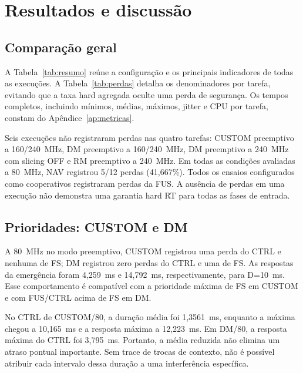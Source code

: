 \section{Resultados e discussão}
\label{sec:resultados}

\subsection{Comparação geral}

A Tabela~\ref{tab:resumo} reúne a configuração e os principais indicadores de todas as execuções. A Tabela~\ref{tab:perdas} detalha os denominadores por tarefa, evitando que a taxa hard agregada oculte uma perda de segurança. Os tempos completos, incluindo mínimos, médias, máximos, jitter e CPU por tarefa, constam do Apêndice~\ref{ap:metricas}.




Seis execuções não registraram perdas nas quatro tarefas: CUSTOM preemptivo a 160/240~MHz, DM preemptivo a 160/240~MHz, DM preemptivo a 240~MHz com slicing OFF e RM preemptivo a 240~MHz. Em todas as condições avaliadas a 80~MHz, NAV registrou 5/12 perdas (41,667\%). Todos os ensaios configurados como cooperativos registraram perdas da FUS. A ausência de perdas em uma execução não demonstra uma garantia hard RT para todas as fases de entrada.


\subsection{Prioridades: CUSTOM e DM}

A 80~MHz no modo preemptivo, CUSTOM registrou uma perda do CTRL e nenhuma de FS; DM registrou zero perdas do CTRL e uma de FS. As respostas da emergência foram 4,259~ms e 14,792~ms, respectivamente, para D=10~ms. Esse comportamento é compatível com a prioridade máxima de FS em CUSTOM e com FUS/CTRL acima de FS em DM.

No CTRL de CUSTOM/80, a duração média foi 1,3561~ms, enquanto a máxima chegou a 10,165~ms e a resposta máxima a 12,223~ms. Em DM/80, a resposta máxima do CTRL foi 3,795~ms. Portanto, a média reduzida não elimina um atraso pontual importante. Sem trace de trocas de contexto, não é possível atribuir cada intervalo dessa duração a uma interferência específica.

